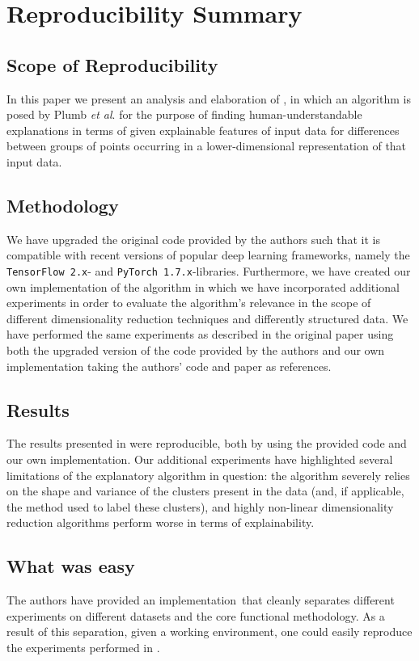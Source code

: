 \section*{\centering Reproducibility Summary}

\subsection*{Scope of Reproducibility}
In this paper we present an analysis and elaboration of \cite{plumb2020explaining}, in which an algorithm is posed by Plumb \textit{et al}. for the purpose of finding human-understandable explanations in terms of given explainable features of input data for differences between groups of points occurring in a lower-dimensional representation of that input data.

\subsection*{Methodology}
We have upgraded the original code provided by the authors such that it is compatible with recent versions of popular deep learning frameworks, namely the \texttt{TensorFlow 2.x}- and \texttt{PyTorch 1.7.x}-libraries. Furthermore, we have created our own implementation of the algorithm in which we have incorporated additional experiments in order to evaluate the algorithm's relevance in the scope of different dimensionality reduction techniques and differently structured data. We have performed the same experiments as described in the original paper using both the upgraded version of the code provided by the authors and our own implementation taking the authors' code and paper as references.

\subsection*{Results}
The results presented in \cite{plumb2020explaining} were reproducible, both by using the provided code and our own implementation. Our additional experiments have highlighted several limitations of the explanatory algorithm in question: the algorithm severely relies on the shape and variance of the clusters present in the data (and, if applicable, the method used to label these clusters), and highly non-linear dimensionality reduction algorithms perform worse in terms of explainability.

\subsection*{What was easy}
The authors have provided an implementation\footnotemark~that cleanly separates different experiments on different datasets and the core functional methodology. As a result of this separation, given a working environment, one could easily reproduce the experiments performed in \cite{plumb2020explaining}.

